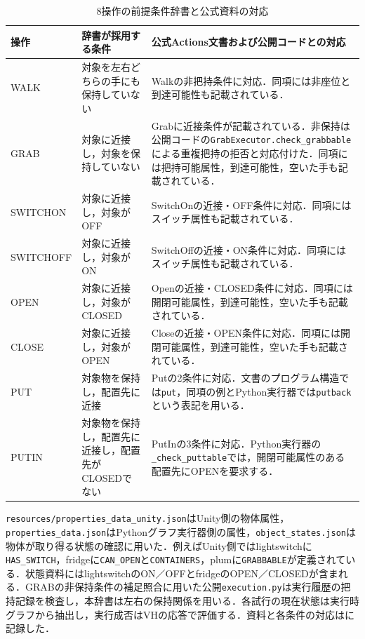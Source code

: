 \begin{table}[tb]
\caption{8操作の前提条件辞書と公式資料の対応}\label{tab:condition_source_scope}
\centering\scriptsize\setlength{\tabcolsep}{3pt}
\begin{tabular}{p{}p{}p{}}
\hline
操作 & 辞書が採用する条件 & 公式Actions文書および公開コードとの対応 \\
\hline
WALK & 対象を左右どちらの手にも保持していない & Walkの非把持条件に対応．同項には非座位と到達可能性も記載されている． \\
GRAB & 対象に近接し，対象を保持していない & Grabに近接条件が記載されている．非保持は公開コードの\texttt{GrabExecutor.check\_grabbable}による重複把持の拒否と対応付けた．同項には把持可能属性，到達可能性，空いた手も記載されている． \\
SWITCHON & 対象に近接し，対象がOFF & SwitchOnの近接・OFF条件に対応．同項にはスイッチ属性も記載されている． \\
SWITCHOFF & 対象に近接し，対象がON & SwitchOffの近接・ON条件に対応．同項にはスイッチ属性も記載されている． \\
OPEN & 対象に近接し，対象がCLOSED & Openの近接・CLOSED条件に対応．同項には開閉可能属性，到達可能性，空いた手も記載されている． \\
CLOSE & 対象に近接し，対象がOPEN & Closeの近接・OPEN条件に対応．同項には開閉可能属性，到達可能性，空いた手も記載されている． \\
PUT & 対象物を保持し，配置先に近接 & Putの2条件に対応．文書のプログラム構造では\texttt{put}，同項の例とPython実行器では\texttt{putback}という表記を用いる． \\
PUTIN & 対象物を保持し，配置先に近接し，配置先がCLOSEDでない & PutInの3条件に対応．Python実行器の\texttt{\_check\_puttable}では，開閉可能属性のある配置先にOPENを要求する． \\
\hline
\end{tabular}
\end{table}

\texttt{resources/properties\_data\_unity.json}はUnity側の物体属性，\texttt{properties\_data.json}はPythonグラフ実行器側の属性，\texttt{object\_states.json}は物体が取り得る状態の確認に用いた．例えばUnity側ではlightswitchに\texttt{HAS\_SWITCH}，fridgeに\texttt{CAN\_OPEN}と\texttt{CONTAINERS}，plumに\texttt{GRABBABLE}が定義されている．状態資料にはlightswitchのON／OFFとfridgeのOPEN／CLOSEDが含まれる．GRABの非保持条件の補足照合に用いた公開\texttt{execution.py}は実行履歴の把持記録を検査し，本辞書は左右の保持関係を用いる．各試行の現在状態は実行時グラフから抽出し，実行成否はVHの応答で評価する．資料と各条件の対応はに記録した．
